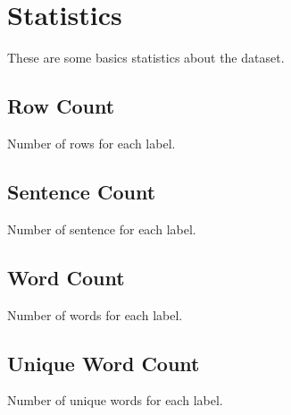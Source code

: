 \section{Statistics}
These are some basics statistics about the dataset. \\

\subsection{Row Count}
Number of rows for each label. \\
\begin{center}
	\begin{adjustbox}{max width=\textwidth}
	\end{adjustbox}
\end{center}

\subsection{Sentence Count}
Number of sentence for each label. \\
\begin{center}
	\begin{adjustbox}{max width=\textwidth}
	\end{adjustbox}
\end{center}

\subsection{Word Count}
Number of words for each label. \\
\begin{center}
	\begin{adjustbox}{max width=\textwidth}
	\end{adjustbox}
\end{center}

\subsection{Unique Word Count}
Number of unique words for each label. \\
\begin{center}
	\begin{adjustbox}{max width=\textwidth}
	\end{adjustbox}
\end{center}

